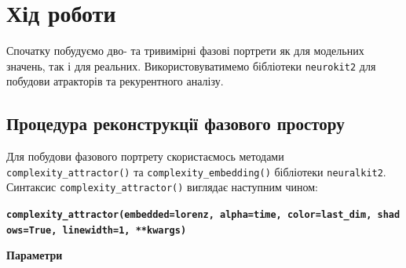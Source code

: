 \documentclass[
  letterpaper,
]{report}
\begin{document}
\hypertarget{ux445ux456ux434-ux440ux43eux431ux43eux442ux438-1}{%
\section{Хід
роботи}\label{ux445ux456ux434-ux440ux43eux431ux43eux442ux438-1}}

Спочатку побудуємо дво- та тривимірні фазові портрети як для модельних
значень, так і для реальних. Використовуватимемо бібліотеки
\texttt{neurokit2} для побудови атракторів та рекурентного аналізу.

\hypertarget{ux43fux440ux43eux446ux435ux434ux443ux440ux430-ux440ux435ux43aux43eux43dux441ux442ux440ux443ux43aux446ux456ux457-ux444ux430ux437ux43eux432ux43eux433ux43e-ux43fux440ux43eux441ux442ux43eux440ux443}{%
\subsection{Процедура реконструкції фазового
простору}\label{ux43fux440ux43eux446ux435ux434ux443ux440ux430-ux440ux435ux43aux43eux43dux441ux442ux440ux443ux43aux446ux456ux457-ux444ux430ux437ux43eux432ux43eux433ux43e-ux43fux440ux43eux441ux442ux43eux440ux443}}

Для побудови фазового портрету скористаємось методами
\texttt{complexity\_attractor()} та \texttt{complexity\_embedding()}
бібліотеки \texttt{neuralkit2}. Синтаксис
\texttt{complexity\_attractor()} виглядає наступним чином:

\textbf{\texttt{complexity\_attractor(embedded=\textquotesingle{}lorenz\textquotesingle{},\ alpha=\textquotesingle{}time\textquotesingle{},\ color=\textquotesingle{}last\_dim\textquotesingle{},\ shadows=True,\ linewidth=1,\ **kwargs)}}

\textbf{Параметри}
\end{document}
